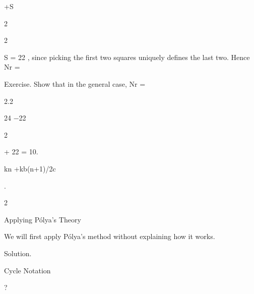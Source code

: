 \documentclass[a4paper,portrait,12pt]{article}
\begin{document}
\begin{flushleft}
+S
\end{flushleft}


2


2





\begin{flushleft}
S = 22 , since picking the first two squares uniquely defines the last two. Hence Nr =
\end{flushleft}


\begin{flushleft}
Exercise. Show that in the general case, Nr =
\end{flushleft}





2.2





24 $-$22


2





+ 22 = 10.





\begin{flushleft}
kn +kb(n+1)/2c
\end{flushleft}


.


2





\begin{flushleft}
Applying P\'{o}lya's Theory
\end{flushleft}





\begin{flushleft}
We will first apply P\'{o}lya's method without explaining how it works.
\end{flushleft}


\begin{flushleft}
Solution.
\end{flushleft}





\begin{flushleft}
Cycle Notation
\end{flushleft}


?
\end{document}
